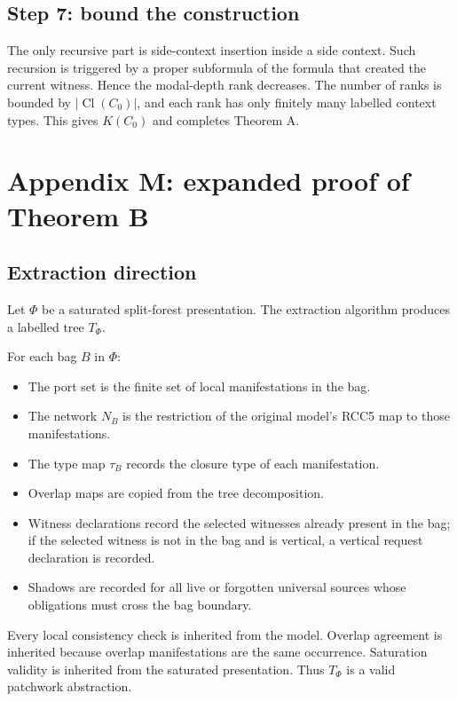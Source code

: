 \documentclass[11pt]{article}
\newcommand{\Cl}{\operatorname{Cl}}
\begin{document}
\subsection{Step 7: bound the construction}

The only recursive part is side-context insertion inside a side context.  Such recursion is triggered by a proper subformula of the formula that created the current witness.  Hence the modal-depth rank decreases.  The number of ranks is bounded by $|\Cl(C_0)|$, and each rank has only finitely many labelled context types.  This gives $K(C_0)$ and completes Theorem A.

\section{Appendix M: expanded proof of Theorem B}

\subsection{Extraction direction}

Let $\Phi$ be a saturated split-forest presentation.  The extraction algorithm produces a labelled tree $T_\Phi$.

For each bag $B$ in $\Phi$:
\begin{itemize}
\item The port set is the finite set of local manifestations in the bag.
\item The network $N_B$ is the restriction of the original model's RCC5 map to those manifestations.
\item The type map $\tau_B$ records the closure type of each manifestation.
\item Overlap maps are copied from the tree decomposition.
\item Witness declarations record the selected witnesses already present in the bag; if the selected witness is not in the bag and is vertical, a vertical request declaration is recorded.
\item Shadows are recorded for all live or forgotten universal sources whose obligations must cross the bag boundary.
\end{itemize}

Every local consistency check is inherited from the model.  Overlap agreement is inherited because overlap manifestations are the same occurrence.  Saturation validity is inherited from the saturated presentation.  Thus $T_\Phi$ is a valid patchwork abstraction.
\end{document}
